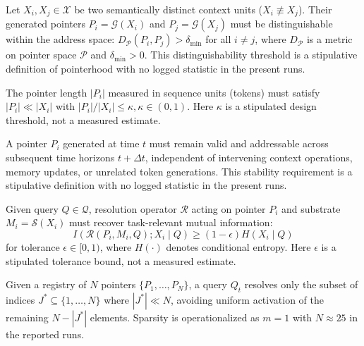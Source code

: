 \documentclass[runningheads]{llncs}
\begin{document}
\begin{axiom}\label{ax:identity}
Let $X_i, X_j \in \mathcal{X}$ be two semantically distinct context units ($X_i \not\equiv X_j$). Their generated pointers $P_i = \mathcal{G}(X_i)$ and $P_j = \mathcal{G}(X_j)$ must be distinguishable within the address space: $D_{\mathcal{P}}(P_i, P_j) > \delta_{\text{min}}$ for all $i \neq j$, where $D_{\mathcal{P}}$ is a metric on pointer space $\mathcal{P}$ and $\delta_{\text{min}} > 0$. This distinguishability threshold is a stipulative definition of pointerhood with no logged statistic in the present runs.
\end{axiom}

\begin{axiom}\label{ax:compactness}
The pointer length $|P_i|$ measured in sequence units (tokens) must satisfy $|P_i| \ll |X_i|$ with $|P_i|/|X_i| \le \kappa, \kappa \in (0, 1)$. Here $\kappa$ is a stipulated design threshold, not a measured estimate.
\end{axiom}

\begin{axiom}\label{ax:stability}
A pointer $P_i$ generated at time $t$ must remain valid and addressable across subsequent time horizons $t + \Delta t$, independent of intervening context operations, memory updates, or unrelated token generations. This stability requirement is a stipulative definition with no logged statistic in the present runs.
\end{axiom}

\begin{axiom}\label{ax:fidelity}
Given query $Q \in \mathcal{Q}$, resolution operator $\mathcal{R}$ acting on pointer $P_i$ and substrate $M_i = \mathcal{S}(X_i)$ must recover task-relevant mutual information:
\begin{equation}
I\left(\mathcal{R}(P_i, M_i, Q); X_i \mid Q\right) \ge (1 - \epsilon) H(X_i \mid Q)
\end{equation}
for tolerance $\epsilon \in [0, 1)$, where $H(\cdot)$ denotes conditional entropy. Here $\epsilon$ is a stipulated tolerance bound, not a measured estimate.
\end{axiom}

\begin{axiom}\label{ax:selectivity}
Given a registry of $N$ pointers $\{P_1, \dots, P_N\}$, a query $Q_t$ resolves only the subset of indices $J^* \subseteq \{1, \dots, N\}$ where $|J^*| \ll N$, avoiding uniform activation of the remaining $N - |J^*|$ elements. Sparsity is operationalized as $m{=}1$ with $N{\approx}25$ in the reported runs.
\end{axiom}
\end{document}
